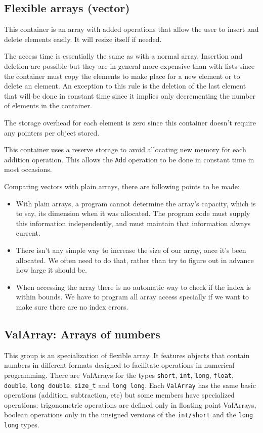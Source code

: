 \documentclass[12pt,a4paper]{memoir} %
\begin{document}
\subsection{Flexible arrays (vector)}
This container is an array with added operations that allow the user to insert and delete elements easily. It will resize itself if needed.

The access time is essentially the same as with a normal array. Insertion and deletion are possible but they are in general more expensive than with lists since the container must copy the elements to make place for a new element or to delete an element. An exception to this rule is the deletion of the last element that will be done in constant time since it implies only decrementing the number of elements in the container.

The storage overhead for each element is zero since this container doesn't require any pointers per object stored.

This container uses a reserve storage to avoid allocating new memory for each addition operation. This allows the \verb,Add, operation to be done in constant time in most occasions.

Comparing vectors with plain arrays, there are following points to be made:
\begin{itemize}
\item With plain arrays, a program cannot determine the array's capacity, which is to say, its dimension when it was allocated.  
The program code must supply this information independently, and must maintain that information always current.

\item There isn't any simple way to increase the size of our array, once it’s been allocated.  We often need to do that, rather than try to figure out 
in advance how large it should be.

\item When accessing the array there is no automatic way to check if the index is within bounds. We have to program all array access specially
if we want to make sure there are no index errors.

\end{itemize}

\subsection{ValArray: Arrays of numbers}
This group is an specialization of flexible array. It features objects that contain numbers in different formats designed to facilitate operations
in numerical programming. There are ValArrays for the types \texttt{short}, \texttt{int}, \texttt{long}, \texttt{float}, \texttt{double},
\texttt{long double}, \texttt{size\_t} and \texttt{long long}. Each \texttt{ValArray} has the same basic operations (addition, subtraction, etc)
but some members have specialized operations: trigonometric operations are defined only in floating point ValArrays, boolean operations only in the unsigned versions of the \texttt{int/short} and the \texttt{long long} types.
\end{document}
